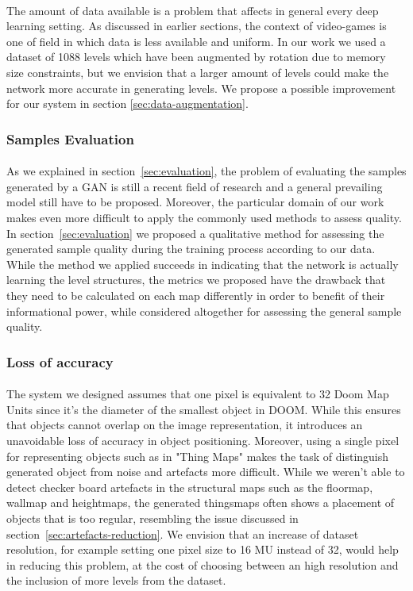\paragraph{} The amount of data available is a problem that affects in general every deep learning setting. As discussed in earlier sections, the context of video-games is one of field in which data is less available and uniform. In our work we used a dataset of 1088 levels which have been augmented by rotation due to memory size constraints, but we envision that a larger amount of levels could make the network more accurate in generating levels. We propose a possible improvement for our system in section \ref{sec:data-augmentation}.
\subsubsection{Samples Evaluation}
\paragraph{} As we explained in section~\ref{sec:evaluation}, the problem of evaluating the samples generated by a GAN is still a recent field of research and a general prevailing model still have to be proposed. Moreover, the particular domain of our work makes even more difficult to apply the commonly used methods to assess quality. In section~\ref{sec:evaluation} we proposed a qualitative method for assessing the generated sample quality during the training process according to our data. While the method we applied succeeds in indicating that the network is actually learning the level structures, the metrics we proposed have the drawback that they need to be calculated on each map differently in order to benefit of their informational power, while considered altogether for assessing the general sample quality. 

\subsubsection{Loss of accuracy}
\paragraph{} The system we designed assumes that one pixel is equivalent to 32 Doom Map Units since it's the diameter of the smallest object in DOOM. While this ensures that objects cannot overlap on the image representation, it introduces an unavoidable loss of accuracy in object positioning. Moreover, using a single pixel for representing objects such as in "Thing Maps" makes the task of distinguish generated object from noise and artefacts more difficult. While we weren't able to detect checker board artefacts in the structural maps such as the floormap, wallmap and heightmaps, the generated \glspl{thingsmap} often shows a placement of objects that is too regular, resembling the issue discussed in section~\ref{sec:artefacts-reduction}. We envision that an increase of dataset resolution, for example setting one pixel size to 16 MU instead of 32, would help in reducing this problem, at the cost of choosing between an high resolution and the inclusion of more levels from the dataset.

